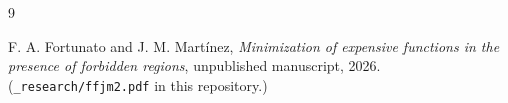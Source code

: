 \documentclass[11pt]{article}
\begin{document}
\begin{thebibliography}{9}

F. A. Fortunato and J. M. Mart\'inez, \emph{Minimization of expensive
functions in the presence of forbidden regions}, unpublished manuscript,
2026. (\texttt{\_research/ffjm2.pdf} in this repository.)

\end{thebibliography}
\end{document}
